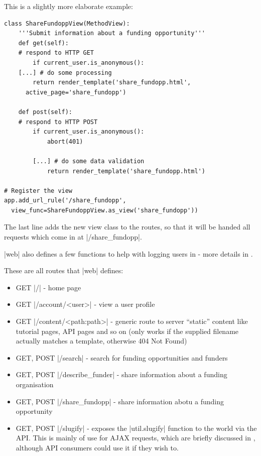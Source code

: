 This is a slightly more elaborate example:
\begin{verbatim}
class ShareFundoppView(MethodView):
    '''Submit information about a funding opportunity'''
    def get(self):
    # respond to HTTP GET
        if current_user.is_anonymous():
	[...] # do some processing
        return render_template('share_fundopp.html',
	  active_page='share_fundopp')

    def post(self):
    # respond to HTTP POST
        if current_user.is_anonymous():
            abort(401)

	    [...] # do some data validation
            return render_template('share_fundopp.html')

# Register the view
app.add_url_rule('/share_fundopp', 
  view_func=ShareFundoppView.as_view('share_fundopp'))
\end{verbatim}

The last line adds the new view class to the routes, so that it will be handed all requests which come in at |/share_fundopp|.

|web| also defines a few functions to help with logging users in - more details in .

These are all routes that |web| defines:
\begin{itemize}
\item GET |/| - home page
\item GET |/account/<user>| - view a user profile
\item GET |/content/<path:path>| - generic route to server ``static'' content like tutorial pages, API pages and so on (only works if the supplied filename actually matches a template, otherwise 404 Not Found)
\item GET, POST |/search| - search for funding opportunities and funders
\item GET, POST |/describe_funder| - share information about a funding organisation
\item GET, POST |/share_fundopp| - share information abotu a funding opportunity
\item GET, POST |/slugify| - exposes the |util.slugify| function to the world via the API. This is mainly of use for AJAX requests, which are briefly discussed in , although API consumers could use it if they wish to.
\end{itemize}


